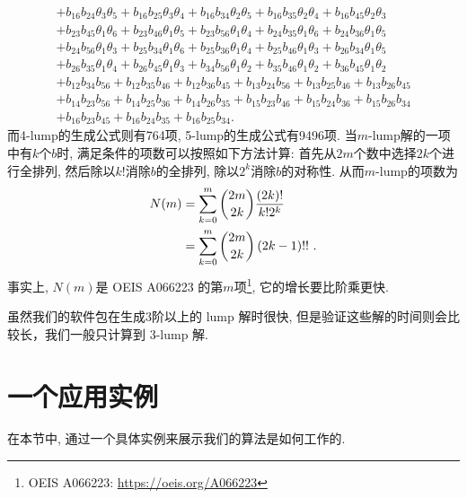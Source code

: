 \begin{equation}
\begin{array}{l}
+b_{{16}}b_{{24}}\theta_{{3}}\theta_{{5}}
+b_{{16}}b_{{25}}\theta_{{3}}\theta_{{4}}
+b_{{16}}b_{{34}}\theta_{{2}}\theta_{{5}}
+b_{{16}}b_{{35}}\theta_{{2}}\theta_{{4}}
+b_{{16}}b_{{45}}\theta_{{2}}\theta_{{3}}\\
+b_{{23}}b_{{45}}\theta_{{1}}\theta_{{6}}
+b_{{23}}b_{{46}}\theta_{{1}}\theta_{{5}}
+b_{{23}}b_{{56}}\theta_{{1}}\theta_{{4}}
+b_{{24}}b_{{35}}\theta_{{1}}\theta_{{6}}
+b_{{24}}b_{{36}}\theta_{{1}}\theta_{{5}}\\
+b_{{24}}b_{{56}}\theta_{{1}}\theta_{{3}}
+b_{{25}}b_{{34}}\theta_{{1}}\theta_{{6}}
+b_{{25}}b_{{36}}\theta_{{1}}\theta_{{4}}
+b_{{25}}b_{{46}}\theta_{{1}}\theta_{{3}}
+b_{{26}}b_{{34}}\theta_{{1}}\theta_{{5}}\\
+b_{{26}}b_{{35}}\theta_{{1}}\theta_{{4}}
+b_{{26}}b_{{45}}\theta_{{1}}\theta_{{3}}
+b_{{34}}b_{{56}}\theta_{{1}}\theta_{{2}}
+b_{{35}}b_{{46}}\theta_{{1}}\theta_{{2}}
+b_{{36}}b_{{45}}\theta_{{1}}\theta_{{2}}\\
+b_{{12}}b_{{34}}b_{{56}}
+b_{{12}}b_{{35}}b_{{46}}
+b_{{12}}b_{{36}}b_{{45}}
+b_{{13}}b_{{24}}b_{{56}}
+b_{{13}}b_{{25}}b_{{46}}
+b_{{13}}b_{{26}}b_{{45}}\\
+b_{{14}}b_{{23}}b_{{56}}
+b_{{14}}b_{{25}}b_{{36}}
+b_{{14}}b_{{26}}b_{{35}}
+b_{{15}}b_{{23}}b_{{46}}
+b_{{15}}b_{{24}}b_{{36}}
+b_{{15}}b_{{26}}b_{{34}}\\
+b_{{16}}b_{{23}}b_{{45}}
+b_{{16}}b_{{24}}b_{{35}}
+b_{{16}}b_{{25}}b_{{34}} .
\end{array}
\end{equation}
而4-lump的生成公式则有764项, 5-lump的生成公式有9496项. 当$m$-lump解的一项中有$k$个$b$时, 满足条件的项数可以按照如下方法计算: 首先从$2m$个数中选择$2k$个进行全排列, 然后除以$k!$消除$b$的全排列, 除以$2^k$消除$b$的对称性. 从而$m$-lump的项数为
\begin{equation}
\begin{split}
N(m)&=\sum_{k=0}^{m}{\binom{2m}{2k}\frac{(2k)!}{k!2^k}} \\ 
&=\sum_{k=0}^m{\binom{2m}{2k}\left(2k-1\right)!!} ~.
\end{split}
\end{equation}
事实上, $N(m)$是 OEIS A066223 的第$m$项\footnote{OEIS A066223: \url{https://oeis.org/A066223}}, 它的增长要比阶乘更快. 

虽然我们的软件包在生成3阶以上的 lump 解时很快, 但是验证这些解的时间则会比较长，我们一般只计算到 3-lump 解.

\section{一个应用实例}
在本节中, 通过一个具体实例来展示我们的算法是如何工作的.

